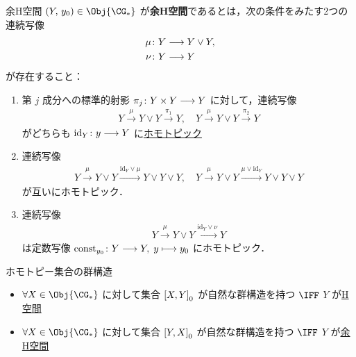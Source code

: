 \documentclass[algtopo_main]{subfiles}
\begin{document}
\begin{mydef}[label=def:coHspace,breakable]{余H空間}
    $(Y,\, y_0) \in \Obj{\CG_*}$ が\textbf{余H空間}であるとは，次の条件をみたす2つの連続写像
    \begin{align}
        \mu &\colon Y \longrightarrow Y \vee Y, \\
        \nu &\colon Y \longrightarrow Y
    \end{align}
    が存在すること：
    \begin{enumerate}
        \item 第 $j$ 成分への標準的射影 $\pi_j \colon Y\times Y \longrightarrow Y$ に対して，連続写像
        \begin{align}
            Y \xrightarrow{\mu} Y\vee Y \xrightarrow{\pi_1} Y,\quad Y \xrightarrow{\mu} Y\vee Y \xrightarrow{\pi_2} Y
        \end{align}
        がどちらも $\mathrm{id}_Y \colon y \longrightarrow Y$ に\hyperref[def:homotopy]{ホモトピック}
        \item 連続写像
        \begin{align}
            Y \xrightarrow{\mu} Y\vee Y \xrightarrow{\mathrm{id}_Y \vee \mu} Y \vee Y \vee Y,\quad Y \xrightarrow{\mu} Y\vee Y \xrightarrow{\mu \vee \mathrm{id}_Y} Y \vee Y \vee Y
        \end{align}
        が互いにホモトピック．
        \item 連続写像
        \begin{align}
            Y \xrightarrow{\mu} Y\vee Y \xrightarrow{\mathrm{id}_Y \vee \nu} Y
        \end{align}
        は定数写像 $\text{const}_{y_0} \colon Y \longrightarrow Y,\; y \longmapsto y_0$ にホモトピック．
    \end{enumerate}
\end{mydef}

\begin{mytheo}[label=thm:homotopy-group]{ホモトピー集合の群構造}
    \begin{itemize}
        \item $\forall X \in \Obj{\CG_*}$ に対して集合 $\comm{X}{Y}_0$ が自然な群構造を持つ $\IFF$ $Y$ が\hyperref[def:Hspace]{H空間}
        \item  $\forall X \in \Obj{\CG_*}$ に対して集合 $\comm{Y}{X}_0$ が自然な群構造を持つ $\IFF$ $Y$ が\hyperref[def:coHspace]{余H空間}
    \end{itemize}
\end{mytheo}
\end{document}
